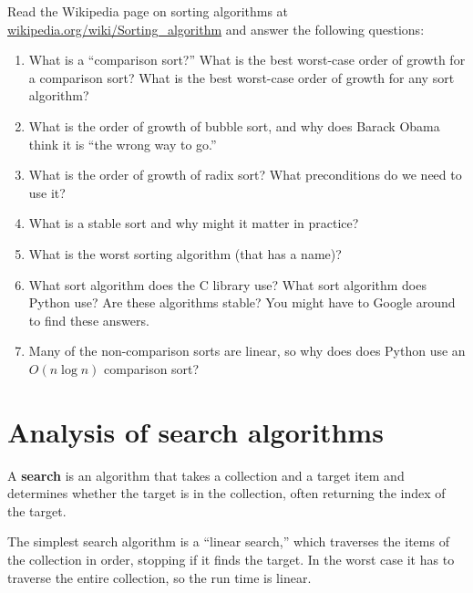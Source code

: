 \documentclass[10pt]{book}
\begin{document}
\begin{ex}

Read the Wikipedia page on sorting algorithms at
\url{wikipedia.org/wiki/Sorting_algorithm} and answer
the following questions:

\begin{enumerate}

\item What is a ``comparison sort?'' What is the best worst-case order
  of growth for a comparison sort?  What is the best worst-case order
  of growth for any sort algorithm?

\item What is the order of growth of bubble sort, and why does Barack
  Obama think it is ``the wrong way to go.''

\item What is the order of growth of radix sort?  What preconditions
  do we need to use it?

\item What is a stable sort and why might it matter in practice?

\item What is the worst sorting algorithm (that has a name)?

\item What sort algorithm does the C library use?  What sort algorithm
  does Python use?  Are these algorithms stable?  You might have to
  Google around to find these answers.

\item Many of the non-comparison sorts are linear, so why does does
  Python use an $O(n \log n)$ comparison sort?

\end{enumerate}

\end{ex}


\section{Analysis of search algorithms}

A {\bf search} is an algorithm that takes a collection and a target
item and determines whether the target is in the collection, often
returning the index of the target.

The simplest search algorithm is a ``linear search,'' which traverses
the items of the collection in order, stopping if it finds the target.
In the worst case it has to traverse the entire collection, so the run
time is linear.
\end{document}
